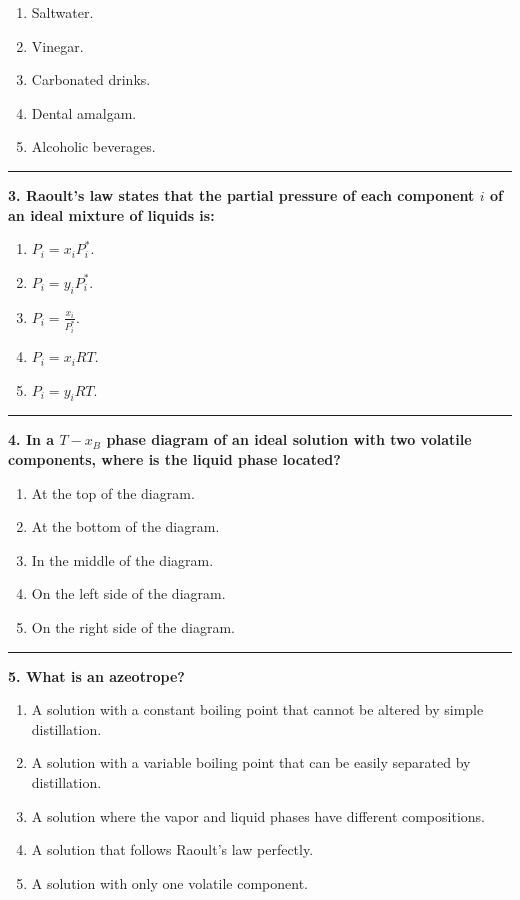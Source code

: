 \documentclass[
  9pt,
]{extbook}
\providecommand{\tightlist}{%
  \setlength{\itemsep}{0pt}\setlength{\parskip}{0pt}}
\theoremstyle{definition}
\theoremstyle{definition}
\theoremstyle{definition}
\theoremstyle{definition}
\theoremstyle{remark}
\begin{document}
\begin{enumerate}
\def\labelenumi{\alph{enumi}.}
\tightlist
\item
  Saltwater.
\item
  Vinegar.
\item
  Carbonated drinks.
\item
  Dental amalgam.
\item
  Alcoholic beverages.
\end{enumerate}

\begin{center}\rule{0.5\linewidth}{0.5pt}\end{center}

\textbf{3. Raoult's law states that the partial pressure of each component \(i\) of an ideal mixture of liquids is:}

\begin{enumerate}
\def\labelenumi{\alph{enumi}.}
\tightlist
\item
  \(P_i = x_i P^*_i\).
\item
  \(P_i = y_i P^*_i\).
\item
  \(P_i = \frac{x_i}{P^*_i}\).
\item
  \(P_i = x_i RT\).
\item
  \(P_i = y_i RT\).
\end{enumerate}

\begin{center}\rule{0.5\linewidth}{0.5pt}\end{center}

\textbf{4. In a \(T-x_B\) phase diagram of an ideal solution with two volatile components, where is the liquid phase located?}

\begin{enumerate}
\def\labelenumi{\alph{enumi}.}
\tightlist
\item
  At the top of the diagram.
\item
  At the bottom of the diagram.
\item
  In the middle of the diagram.
\item
  On the left side of the diagram.
\item
  On the right side of the diagram.
\end{enumerate}

\begin{center}\rule{0.5\linewidth}{0.5pt}\end{center}

\textbf{5. What is an azeotrope?}

\begin{enumerate}
\def\labelenumi{\alph{enumi}.}
\tightlist
\item
  A solution with a constant boiling point that cannot be altered by simple distillation.
\item
  A solution with a variable boiling point that can be easily separated by distillation.
\item
  A solution where the vapor and liquid phases have different compositions.
\item
  A solution that follows Raoult's law perfectly.
\item
  A solution with only one volatile component.
\end{enumerate}
\end{document}
